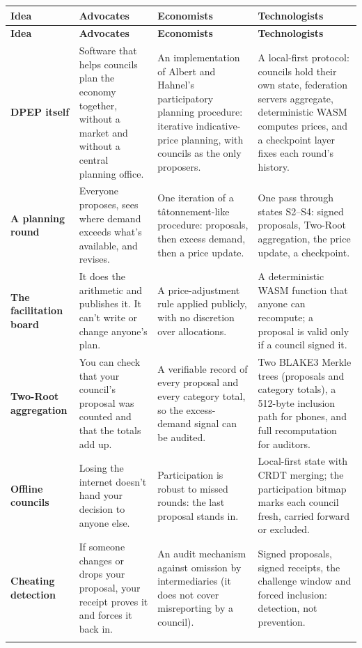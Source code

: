 \documentclass[10pt,twoside,openany]{book}
\renewcommand{\arraystretch}{1.22}
\theoremstyle{dpepstyle}
\begin{document}
{\scriptsize\setlength{\tabcolsep}{3pt}\renewcommand{\arraystretch}{1.2}
\begin{longtable}{L{0.72in} L{1.3in} L{1.3in} L{1.3in}}
\toprule
\textbf{Idea} & \textbf{Advocates} & \textbf{Economists} & \textbf{Technologists} \\
\midrule
\endfirsthead
\toprule
\textbf{Idea} & \textbf{Advocates} & \textbf{Economists} & \textbf{Technologists} \\
\midrule
\endhead
\bottomrule
\endlastfoot
\textbf{DPEP itself} & Software that helps councils plan the economy together, without a market and without a central planning office. & An implementation of Albert and Hahnel's participatory planning procedure: iterative indicative-price planning, with councils as the only proposers. & A local-first protocol: councils hold their own state, federation servers aggregate, deterministic WASM computes prices, and a checkpoint layer fixes each round's history. \\ \addlinespace[2pt]
\textbf{A planning round} & Everyone proposes, sees where demand exceeds what's available, and revises. & One iteration of a tâtonnement-like procedure: proposals, then excess demand, then a price update. & One pass through states S2--S4: signed proposals, Two-Root aggregation, the price update, a checkpoint. \\ \addlinespace[2pt]
\textbf{The facilitation board} & It does the arithmetic and publishes it. It can't write or change anyone's plan. & A price-adjustment rule applied publicly, with no discretion over allocations. & A deterministic WASM function that anyone can recompute; a proposal is valid only if a council signed it. \\ \addlinespace[2pt]
\textbf{Two-Root aggregation} & You can check that your council's proposal was counted and that the totals add up. & A verifiable record of every proposal and every category total, so the excess-demand signal can be audited. & Two BLAKE3 Merkle trees (proposals and category totals), a 512-byte inclusion path for phones, and full recomputation for auditors. \\ \addlinespace[2pt]
\textbf{Offline councils} & Losing the internet doesn't hand your decision to anyone else. & Participation is robust to missed rounds: the last proposal stands in. & Local-first state with CRDT merging; the participation bitmap marks each council fresh, carried forward or excluded. \\ \addlinespace[2pt]
\textbf{Cheating detection} & If someone changes or drops your proposal, your receipt proves it and forces it back in. & An audit mechanism against omission by intermediaries (it does not cover misreporting by a council). & Signed proposals, signed receipts, the challenge window and forced inclusion: detection, not prevention. \\ \addlinespace[2pt]

\end{longtable}}
\end{document}
